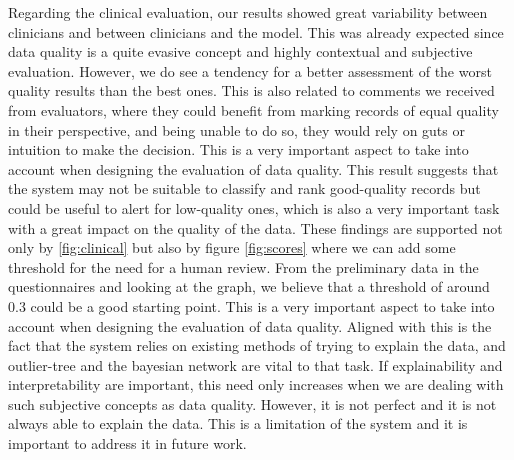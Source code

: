 Regarding the clinical evaluation, our results showed great variability between clinicians and between clinicians and the model. This was already expected since data quality is a quite evasive concept and highly contextual and subjective evaluation. However, we do see a tendency for a better assessment of the worst quality results than the best ones. This is also related to comments we received from evaluators, where they could benefit from marking records of equal quality in their perspective, and being unable to do so, they would rely on guts or intuition to make the decision. This is a very important aspect to take into account when designing the evaluation of data quality.
This result suggests that the system may not be suitable to classify and rank good-quality records but could be useful to alert for low-quality ones, which is also a very important task with a great impact on the quality of the data. These findings are supported not only by \ref*{fig:clinical} but also by figure \ref*{fig:scores} where we can add some threshold for the need for a human review. From the preliminary data in the questionnaires and looking at the graph, we believe that a threshold of around 0.3 could be a good starting point. This is a very important aspect to take into account when designing the evaluation of data quality.
Aligned with this is the fact that the system relies on existing methods of trying to explain the data, and outlier-tree and the bayesian network are vital to that task. If explainability and interpretability are important, this need only increases when we are dealing with such subjective concepts as data quality.
However, it is not perfect and it is not always able to explain the data. This is a limitation of the system and it is important to address it in future work.